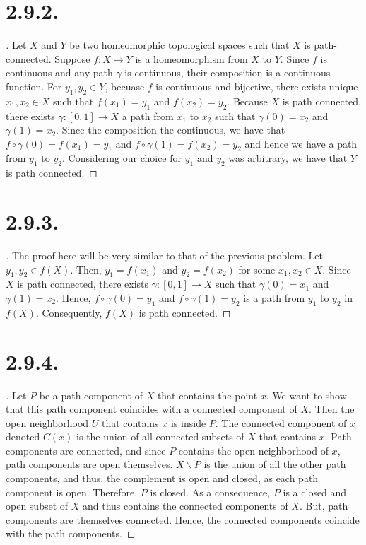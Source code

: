 \documentclass{article}
\begin{document}
\section*{2.9.2.}
\begin{proof}[\unskip\nopunct]
Let $X$ and $Y$ be two homeomorphic topological spaces
such that $X$ is path-connected. Suppose $f:X \to Y$ is a homeomorphism from $X$ to $Y$. Since $f$ is continuous and 
any path $\gamma$ is continuous, their composition is a continuous function. For $y_1, y_2 \in Y$, becuase $f$ is continuous and bijective, there exists unique $x_1, x_2 \in X$ such that $f(x_1) = y_1$ and $f(x_2) = y_2$. Because $X$ is path connected, there exists $\gamma:[0, 1] \to X$ a path from $x_1$ to $x_2$ such that $\gamma(0) = x_2$ and $\gamma(1) = x_2$. Since the composition the continuous, we have that $f \circ \gamma(0) = f(x_1) = y_1$ and $f \circ \gamma(1) = f(x_2) = y_2$ and hence we have a path from $y_1$ to $y_2$. Considering our choice for $y_1$ and $y_2$ was arbitrary, we have that $Y$ is path connected.     
\end{proof}

\section*{2.9.3.}
\begin{proof}[\unskip\nopunct]
    The proof here will be very similar to that of the previous problem. Let $y_1, y_2 \in f(X)$. Then, $y_1 = f(x_1)$ and $y_2 = f(x_2)$ for some $x_1, x_2 \in X$. Since $X$ is path connected, there exists $\gamma:[0, 1] \to X$ such that $\gamma(0) = x_1$ and $\gamma(1) = x_2$. Hence, $f \circ \gamma (0) = y_1$ and $f \circ \gamma (1) = y_2$ is a path from $y_1$ to $y_2$ in $f(X)$. Consequently, $f(X)$ is path connected. 
\end{proof}

\section*{2.9.4.}
\begin{proof}[\unskip\nopunct]
    Let $P$ be a path component of $X$ that contains the point $x$. 
    We want to show that this path component coincides with 
    a connected component of $X$. Then the open neighborhood $U$ 
    that contains $x$ is inside $P$. The 
    connected component of $x$ denoted $C(x)$ is the union 
    of all connected subsets of $X$ that contains $x$.
    Path components are connected, and since $P$ contains
    the open neighborhood of $x$, path components are open themselves. 
    $X\backslash P$ is the union of all the other path components, and thus, the complement
    is open and closed, as each path component is open. 
    Therefore, $P$ is closed. As a consequence, $P$ is a closed 
    and open subset of $X$ and thus contains the connected
    components of $X$. But, path components are themselves connected. Hence, the connected components coincide with the 
    path components.   
\end{proof}
\end{document}
